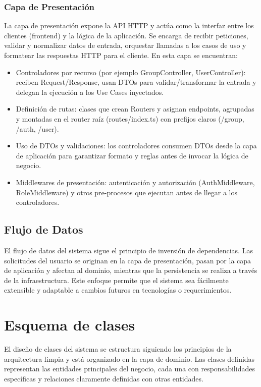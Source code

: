 \documentclass[12pt,a4paper,spanish,oneside]{report}
\begin{document}
\subsection{Capa de Presentación}
La capa de presentación expone la API HTTP y actúa como la interfaz entre los clientes (frontend) y la lógica de la aplicación. Se encarga de recibir peticiones, validar y normalizar datos de entrada, orquestar llamadas a los casos de uso y formatear las respuestas HTTP para el cliente. En esta capa se encuentran:
\begin{itemize}
    \item Controladores por recurso (por ejemplo GroupController, UserController): reciben Request/Response, usan DTOs para validar/transformar la entrada y delegan la ejecución a los Use Cases inyectados.
    \item Definición de rutas: clases que crean Routers y asignan endpoints, agrupadas y montadas en el router raíz (routes/index.ts) con prefijos claros (/group, /auth, /user).
    \item Uso de DTOs y validaciones: los controladores consumen DTOs desde la capa de aplicación para garantizar formato y reglas antes de invocar la lógica de negocio.
    \item Middlewares de presentación: autenticación y autorización (AuthMiddleware, RoleMiddleware) y otros pre-procesos que ejecutan antes de llegar a los controladores.
\end{itemize}

\section{Flujo de Datos}
El flujo de datos del sistema sigue el principio de inversión de dependencias. Las solicitudes del usuario se originan en la capa de presentación, pasan por la capa de aplicación
y afectan al dominio, mientras que la persistencia se realiza a través de la infraestructura.
Este enfoque permite que el sistema sea fácilmente extensible y adaptable a cambios
futuros en tecnologías o requerimientos.

\chapter{Esquema de clases}

El diseño de clases del sistema se estructura siguiendo los principios de la arquitectura limpia y está organizado en la capa de dominio. Las clases definidas representan las entidades principales del negocio, cada una con responsabilidades específicas y relaciones claramente definidas con otras entidades.
\end{document}
